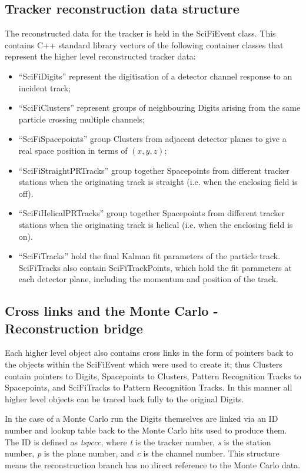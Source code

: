 \subsection{Tracker reconstruction data structure}
\label{subsec:TrackerReconDataStructure}
The reconstructed data for the tracker is held in the SciFiEvent class.  This contains C++ standard library vectors of the following container classes that represent the higher level reconstructed tracker data:
\begin{itemize}
  \item ``SciFiDigits'' represent the digitisation of a detector channel response to an incident track;
  \item ``SciFiClusters'' represent groups of neighbouring Digits arising from the same particle crossing multiple channels;
  \item ``SciFiSpacepoints'' group Clusters from adjacent detector planes to give a real space position in terms of $(x, y, z)$;
  \item ``SciFiStraightPRTracks'' group together Spacepoints from different tracker stations when the originating track is straight (i.e. when the enclosing field is off). %
  \item ``SciFiHelicalPRTracks'' group together Spacepoints from different tracker stations when the originating track is helical (i.e. when the enclosing field is on). %
  \item ``SciFiTracks'' hold the final Kalman fit parameters of the particle track. SciFiTracks also contain SciFiTrackPoints, which hold the fit parameters at each detector plane, including the momentum and position of the track.
\end{itemize}

\subsection{Cross links and the Monte Carlo - Reconstruction bridge}
\label{subsec:CrossLinksAndMCBridge}
Each higher level object also contains cross links in the form of pointers back to the objects within the SciFiEvent which were used to create it; thus Clusters contain pointers to Digits, Spacepoints to Clusters, Pattern Recognition Tracks to Spacepoints, and SciFiTracks to Pattern Recognition Tracks. In this manner all higher level objects can be traced back fully to the original Digits.  

In the case of a Monte Carlo run the Digits themselves are linked via an ID number and lookup table back to the Monte Carlo hits used to produce them. The ID is defined as \textit{tspccc}, where \textit{t} is the tracker number, \textit{s} is the station number, \textit{p} is the plane number, and \textit{c} is the channel number.  This structure means the reconstruction branch has no direct reference to the Monte Carlo data.